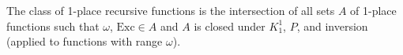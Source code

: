 The class of 1-place recursive functions is the intersection of all sets $A$ of 1-place functions such that $\omega$, $\mathrm{Exc} \in A$ and $A$ is closed under $K_1^1$, $P$, and inversion (applied to functions with range $\omega$).
